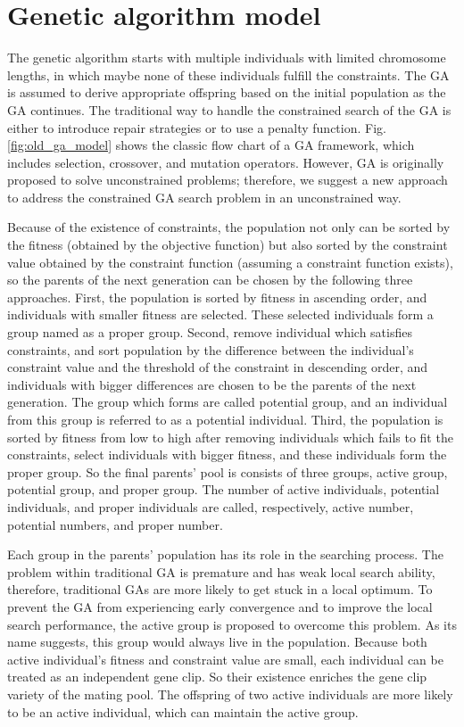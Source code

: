 \section{Genetic algorithm model}



The genetic algorithm starts with multiple individuals with limited chromosome lengths, in
which maybe none of these individuals fulfill the constraints. The GA is
assumed to derive appropriate offspring based on the initial population as the
GA continues. The traditional way to handle the constrained search of the GA is
either to introduce repair strategies or to use a penalty function. Fig.
\ref{fig:old_ga_model} shows the classic flow chart of a GA framework, which
includes selection, crossover, and mutation operators. However, GA is originally
proposed to solve unconstrained problems; therefore, we suggest a new approach 
to address the constrained GA search problem in an unconstrained way. 

Because of the existence of constraints, the population not only can be sorted
by the fitness (obtained by the objective function) but also sorted by
the constraint value obtained by the constraint function (assuming a constraint
function exists), so the parents of the next generation can be chosen by the
following three approaches. First, the population is sorted by fitness in
ascending order, and individuals with smaller fitness are selected. These
selected individuals form a group named as a proper group. Second, remove
individual which satisfies constraints, and sort population by the difference
between the individual's constraint value and the threshold of the constraint
in descending order, and individuals with bigger differences are chosen to be
the parents of the next generation. The group which forms are called potential
group, and an individual from this group is referred to as a potential
individual.  Third, the population is sorted by fitness from low to high after
removing individuals which fails to fit the constraints, select individuals
with bigger fitness, and these individuals form the proper group.  So the final
parents' pool is consists of three groups, active group, potential group, and
proper group.  The number of active individuals, potential individuals, and
proper individuals are called, respectively, active number, potential numbers,
and proper number. 

Each group in the parents' population has its role in the searching
process. The problem within traditional GA is premature and has weak local
search ability, therefore, traditional GAs are more likely to get stuck in a
local optimum. To prevent the GA from experiencing early convergence and to
improve the local search performance, the active group is proposed to overcome
this problem. As its name suggests, this group would always live in the
population.  Because both active individual's fitness and constraint value are small,
each individual can be treated as an independent gene clip. So their existence
enriches the gene clip variety of the mating pool. The offspring of two active
individuals are more likely to be an active individual, which can maintain the
active group.

